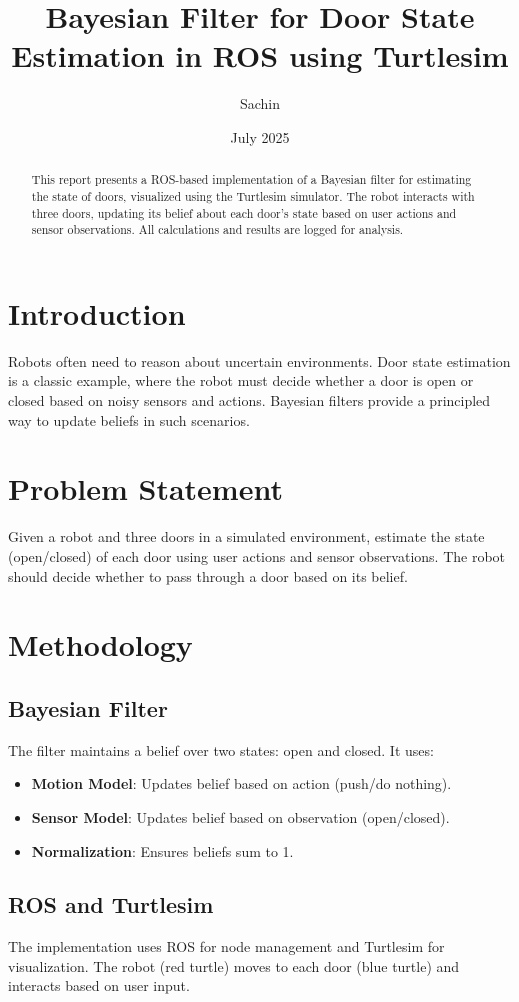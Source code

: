 \documentclass[12pt]{article}
\title{Bayesian Filter for Door State Estimation in ROS using Turtlesim}
\author{Sachin}
\date{July 2025}
\begin{document}
\maketitle
\begin{abstract}
This report presents a ROS-based implementation of a Bayesian filter for estimating the state of doors, visualized using the Turtlesim simulator. The robot interacts with three doors, updating its belief about each door's state based on user actions and sensor observations. All calculations and results are logged for analysis.
\end{abstract}
\section{Introduction}
Robots often need to reason about uncertain environments. Door state estimation is a classic example, where the robot must decide whether a door is open or closed based on noisy sensors and actions. Bayesian filters provide a principled way to update beliefs in such scenarios.
\section{Problem Statement}
Given a robot and three doors in a simulated environment, estimate the state (open/closed) of each door using user actions and sensor observations. The robot should decide whether to pass through a door based on its belief.
\section{Methodology}
\subsection{Bayesian Filter}
The filter maintains a belief over two states: open and closed. It uses:
\begin{itemize}
  \item \textbf{Motion Model}: Updates belief based on action (push/do nothing).
  \item \textbf{Sensor Model}: Updates belief based on observation (open/closed).
  \item \textbf{Normalization}: Ensures beliefs sum to 1.
\end{itemize}
\subsection{ROS and Turtlesim}
The implementation uses ROS for node management and Turtlesim for visualization. The robot (red turtle) moves to each door (blue turtle) and interacts based on user input.
\end{document}
